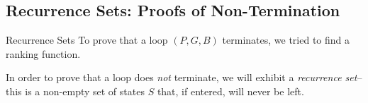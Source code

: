 \documentclass[xcolor=pdftex,t,11pt]{beamer}
\begin{document}
\subsection{Recurrence Sets: Proofs of Non-Termination}

\begin{frame}{Recurrence Sets}
 To prove that a loop $(P, G, B)$ terminates, we tried to find a ranking function.

 \vspace{1em}

 In order to prove that a loop does \emph{not} terminate, we will exhibit a \emph{recurrence set}\footnotemark --
 this is a non-empty set of states $S$ that, if entered, will never be left.

 
\end{frame}
\end{document}
